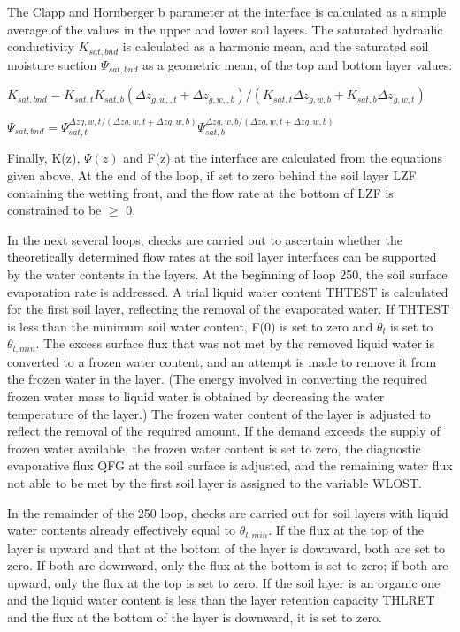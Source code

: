 The Clapp and Hornberger b parameter at the interface is calculated as a simple average of the values in the upper and lower soil layers. The saturated hydraulic conductivity $K_{sat,bnd}$ is calculated as a harmonic mean, and the saturated soil moisture suction $\Psi_{sat,bnd}$ as a geometric mean, of the top and bottom layer values\+:

$ K_{sat,bnd} = K_{sat,t} K_{sat,b} ( \Delta z_{g,w,,t} + \Delta z_{g,w,,b} ) / ( K_{sat,t} \Delta z_{g,w,b} + K_{sat,b} \Delta z_{g,w,t} ) $

$ \Psi_{sat,bnd} = \Psi_{sat,t}^{\Delta zg,w,t/(\Delta zg,w,t + \Delta zg,w,b)} \Psi_{sat,b}^{\Delta zg,w,b/(\Delta zg,w,t + \Delta zg,w,b)} $

Finally, K(z), $\Psi(z)$ and F(z) at the interface are calculated from the equations given above. At the end of the loop, if set to zero behind the soil layer L\+Z\+F containing the wetting front, and the flow rate at the bottom of L\+Z\+F is constrained to be $\geq$ 0.

In the next several loops, checks are carried out to ascertain whether the theoretically determined flow rates at the soil layer interfaces can be supported by the water contents in the layers. At the beginning of loop 250, the soil surface evaporation rate is addressed. A trial liquid water content T\+H\+T\+E\+S\+T is calculated for the first soil layer, reflecting the removal of the evaporated water. If T\+H\+T\+E\+S\+T is less than the minimum soil water content, F(0) is set to zero and $\theta_l$ is set to $\theta_{l,min}$. The excess surface flux that was not met by the removed liquid water is converted to a frozen water content, and an attempt is made to remove it from the frozen water in the layer. (The energy involved in converting the required frozen water mass to liquid water is obtained by decreasing the water temperature of the layer.) The frozen water content of the layer is adjusted to reflect the removal of the required amount. If the demand exceeds the supply of frozen water available, the frozen water content is set to zero, the diagnostic evaporative flux Q\+F\+G at the soil surface is adjusted, and the remaining water flux not able to be met by the first soil layer is assigned to the variable W\+L\+O\+S\+T.

In the remainder of the 250 loop, checks are carried out for soil layers with liquid water contents already effectively equal to $\theta_{l,min}$. If the flux at the top of the layer is upward and that at the bottom of the layer is downward, both are set to zero. If both are downward, only the flux at the bottom is set to zero; if both are upward, only the flux at the top is set to zero. If the soil layer is an organic one and the liquid water content is less than the layer retention capacity T\+H\+L\+R\+E\+T and the flux at the bottom of the layer is downward, it is set to zero.

